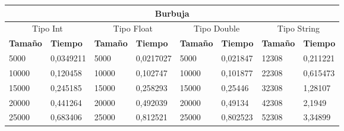 \documentclass[11pt,openany]{book}
\begin{document}
\begin{table}[!ht]
    \centering
    \small
    \begin{tabular}{|l|l|l|l|l|l|l|l|}
        \hline
        \multicolumn{8}{|c|}{\cellcolor{blue!20}\textbf{Burbuja}}                                                                                                                                                                                                                                  \\ \hline
        \multicolumn{2}{|c|}{\cellcolor{gray!20}Tipo Int} & \multicolumn{2}{c|}{\cellcolor{gray!20}Tipo Float} & \multicolumn{2}{c|}{\cellcolor{gray!20}Tipo Double} & \multicolumn{2}{c|}{\cellcolor{gray!20}Tipo String}                                                                         \\ \hline
        \textbf{Tamaño}                                   & \textbf{Tiempo}                                    & \textbf{Tamaño}                                     & \textbf{Tiempo}                                     & \textbf{Tamaño} & \textbf{Tiempo} & \textbf{Tamaño} & \textbf{Tiempo} \\ \hline
        5000                                              & 0,0349211                                          & 5000                                                & 0,0217027                                           & 5000            & 0,021847        & 12308           & 0,211221        \\ \hline
        10000                                             & 0,120458                                           & 10000                                               & 0,102747                                            & 10000           & 0,101877        & 22308           & 0,615473        \\ \hline
        15000                                             & 0,245185                                           & 15000                                               & 0,258293                                            & 15000           & 0,25446         & 32308           & 1,28107         \\ \hline
        20000                                             & 0,441264                                           & 20000                                               & 0,492039                                            & 20000           & 0,49134         & 42308           & 2,1949          \\ \hline
        25000                                             & 0,683406                                           & 25000                                               & 0,812521                                            & 25000           & 0,802523        & 52308           & 3,34899         \\ \hline

\end{tabular}
\end{table}
\end{document}
